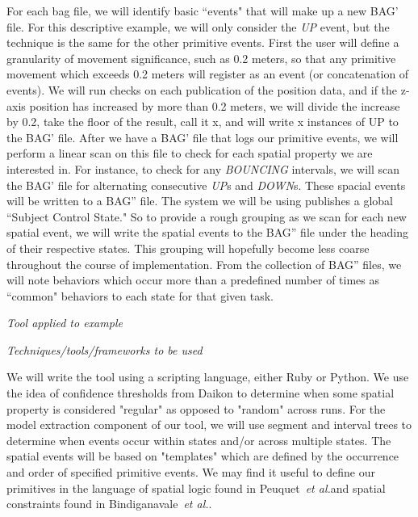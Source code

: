 \documentclass{article}
\newcommand\etal{\emph{et al.}}
\begin{document}
For each bag file, we will identify basic ``events" that will make up a new BAG' file.  
For this descriptive example, we will only consider the \emph{UP} event, but the technique is the same for the other primitive events.  
First the user will define a granularity of movement significance, such as 0.2 meters, so that any primitive movement which exceeds 0.2 meters will register as an event (or concatenation of events).
We will run checks on each publication of the position data, and if the z-axis position has increased by more than 0.2 meters, we will divide the increase by 0.2, take the floor of the result, call it x, and will write x instances of UP to the BAG' file.  
After we have a BAG' file that logs our primitive events, we will perform a linear scan on this file to check for each spatial property we are interested in.  
For instance, to check for any \emph{BOUNCING} intervals, we will scan the BAG' file for alternating consecutive \emph{UP}s and \emph{DOWN}s. 
These spacial events will be written to a BAG'' file.
The system we will be using publishes a global ``Subject Control State."
So to provide a rough grouping as we scan for each new spatial event, we will write the spatial events to the BAG'' file under the heading of their respective states.
This grouping will hopefully become less coarse throughout the course of implementation.
From the collection of BAG'' files, we will note behaviors which occur more than a predefined number of times as ``common" behaviors to each state for that given task.

\emph{Tool applied to example}


\emph{Techniques/tools/frameworks to be used}

We will write the tool using a scripting language, either Ruby or Python.
We use the idea of confidence thresholds from Daikon to determine when some spatial property is considered "regular" as opposed to "random" across runs. 
For the model extraction component of our tool, we will use segment and interval trees to determine when events occur within states and/or across multiple states.
The spatial events will be based on "templates" which are defined by the occurrence and order of specified primitive events.
We may find it useful to define our primitives in the language of spatial logic found in Peuquet~\etal and spatial constraints found in Bindiganavale~\etal. 
\end{document}
